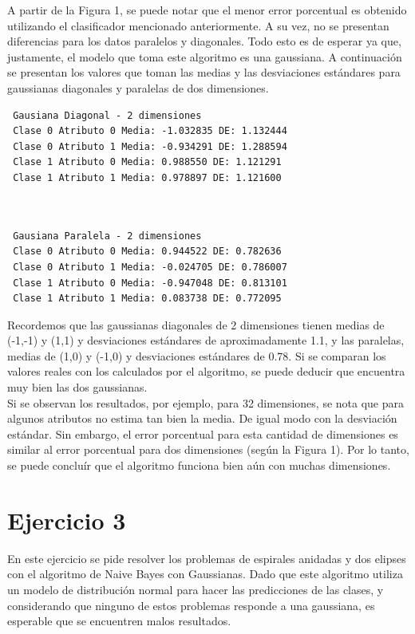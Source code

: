 \documentclass[12pt, a4paper]{article}
\begin{document}
\bigskip

A partir de la Figura 1, se puede notar que el menor error porcentual es obtenido utilizando el clasificador mencionado anteriormente. A su vez, no se presentan diferencias para los datos paralelos y diagonales. Todo esto es de esperar ya que, justamente, el modelo que toma este algoritmo es una gaussiana. A continuación se presentan los valores que toman las medias y las desviaciones estándares para gaussianas diagonales y paralelas de dos dimensiones.

\newpage

 \begin{verbatim}
 Gausiana Diagonal - 2 dimensiones 
 Clase 0 Atributo 0 Media: -1.032835 DE: 1.132444
 Clase 0 Atributo 1 Media: -0.934291 DE: 1.288594
 Clase 1 Atributo 0 Media: 0.988550 DE: 1.121291
 Clase 1 Atributo 1 Media: 0.978897 DE: 1.121600
 
 
\end{verbatim}

\begin{verbatim}
 Gausiana Paralela - 2 dimensiones
 Clase 0 Atributo 0 Media: 0.944522 DE: 0.782636
 Clase 0 Atributo 1 Media: -0.024705 DE: 0.786007
 Clase 1 Atributo 0 Media: -0.947048 DE: 0.813101
 Clase 1 Atributo 1 Media: 0.083738 DE: 0.772095 
 \end{verbatim}
Recordemos que las gaussianas diagonales de 2 dimensiones tienen medias de (-1,-1) y (1,1) y desviaciones estándares de aproximadamente 1.1, y las paralelas, medias de (1,0) y (-1,0) y desviaciones estándares de 0.78. Si se comparan los valores reales con los calculados por el algoritmo, se puede deducir que encuentra muy bien las dos gaussianas. \\
Si se observan los resultados, por ejemplo, para 32 dimensiones, se nota que para algunos atributos no estima tan bien la media. De igual modo con la desviación estándar. Sin embargo, el error porcentual para esta cantidad de dimensiones es similar al error porcentual para dos dimensiones (según la Figura 1). Por lo tanto, se puede concluír que el algoritmo funciona bien aún con muchas dimensiones.

\section*{Ejercicio 3}

En este ejercicio se pide resolver los problemas de espirales anidadas y dos elipses con el algoritmo de Naive Bayes con Gaussianas. Dado que este algoritmo utiliza un modelo de distribución normal para hacer las predicciones de las clases, y considerando que ninguno de estos problemas responde a una gaussiana, es esperable que se encuentren malos resultados.
\end{document}
